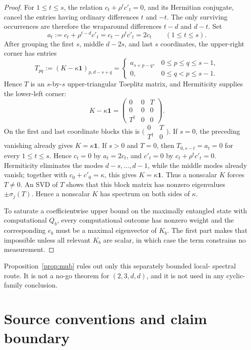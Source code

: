 \documentclass[11pt]{article}
\theoremstyle{definition}
\theoremstyle{remark}
\newcommand{\Id}{\mathbf 1}
\begin{document}
\begin{proof}
For \(1\leq t\leq s\), the relation
\(c_t+\rho^t c'_t=0\), and its Hermitian conjugate, cancel the entries
having ordinary differences \(t\) and \(-t\).  The only surviving
occurrences are therefore the wraparound differences \(t-d\) and \(d-t\).
Set
\[
 a_t:=c_t+\rho^{t-d}c'_t
     =c_t-\rho^t c'_t
     =2c_t
 \qquad(1\leq t\leq s).
\]
After grouping the first \(s\), middle \(d-2s\), and last \(s\)
coordinates, the upper-right corner has entries
\[
 T_{pq}:=(K-\kappa\Id)_{p,d-s+q}
 =\begin{cases}
 a_{s+p-q},&0\leq p\leq q\leq s-1,\\
 0,&0\leq q<p\leq s-1.
 \end{cases}
\]
Hence \(T\) is an \(s\)-by-\(s\) upper-triangular Toeplitz matrix, and
Hermiticity supplies the lower-left corner:
\[
 K-\kappa\Id=
 \begin{pmatrix}0&0&T\\0&0&0\\T^\dagger&0&0\end{pmatrix}.
\]
On the first and last coordinate blocks this is
\(\bigl(\begin{smallmatrix}0&T\\T^\dagger&0\end{smallmatrix}\bigr)\).
If \(s=0\), the preceding vanishing already gives \(K=\kappa\Id\).  If
\(s>0\) and \(T=0\), then \(T_{0,s-t}=a_t=0\) for every
\(1\leq t\leq s\).  Hence \(c_t=0\) by \(a_t=2c_t\), and \(c'_t=0\) by
\(c_t+\rho^tc'_t=0\).  Hermiticity eliminates the modes
\(d-s,\ldots,d-1\), while the middle modes already vanish; together with
\(c_0+c'_0=\kappa\), this gives \(K=\kappa\Id\).  Thus a nonscalar \(K\)
forces \(T\neq0\).
An SVD of \(T\) shows that this block matrix has nonzero eigenvalues
\(\pm\sigma_j(T)\).  Hence a nonscalar \(K\) has spectrum on both sides of
\(\kappa\).

To saturate a coefficientwise upper bound on the maximally entangled state
with computational \(Q_b\), every computational outcome has nonzero weight
and the corresponding \(e_b\) must be a maximal eigenvector of \(K_b\).
The first part makes that impossible unless all relevant \(K_b\) are scalar,
in which case the term constrains no measurement.
\end{proof}

Proposition~\ref{prop:mub} rules out only this separately bounded local-
spectral route.  It is not a no-go theorem for \((2,3,d,d)\), and it is not
used in any cyclic-family conclusion.

\section{Source conventions and claim boundary}
\label{app:conventions}
\end{document}

